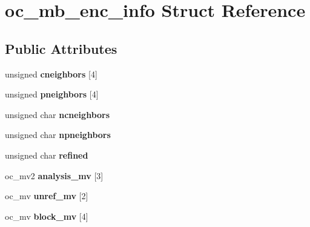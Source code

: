 \hypertarget{structoc__mb__enc__info}{\section{oc\+\_\+mb\+\_\+enc\+\_\+info Struct Reference}
\label{structoc__mb__enc__info}
}
\subsection*{Public Attributes}
\begin{DoxyCompactItemize}
\item 
\hypertarget{structoc__mb__enc__info_aad897a2c6b28665775770445798eb5e6}{unsigned {\bfseries cneighbors} \mbox{[}4\mbox{]}}\label{structoc__mb__enc__info_aad897a2c6b28665775770445798eb5e6}

\item 
\hypertarget{structoc__mb__enc__info_ae4c525d0e9ffafadc4cc9e86fe8dbc77}{unsigned {\bfseries pneighbors} \mbox{[}4\mbox{]}}\label{structoc__mb__enc__info_ae4c525d0e9ffafadc4cc9e86fe8dbc77}

\item 
\hypertarget{structoc__mb__enc__info_ace70691f2dbde546e1bac6bf825f3b90}{unsigned char {\bfseries ncneighbors}}\label{structoc__mb__enc__info_ace70691f2dbde546e1bac6bf825f3b90}

\item 
\hypertarget{structoc__mb__enc__info_aae5755e1914d9366ed0a449fd0202fe4}{unsigned char {\bfseries npneighbors}}\label{structoc__mb__enc__info_aae5755e1914d9366ed0a449fd0202fe4}

\item 
\hypertarget{structoc__mb__enc__info_a6740834c1785f70dc697afbef78f3ade}{unsigned char {\bfseries refined}}\label{structoc__mb__enc__info_a6740834c1785f70dc697afbef78f3ade}

\item 
\hypertarget{structoc__mb__enc__info_ad60ff5d0008e4e811b8e6ee250dc63a7}{oc\+\_\+mv2 {\bfseries analysis\+\_\+mv} \mbox{[}3\mbox{]}}\label{structoc__mb__enc__info_ad60ff5d0008e4e811b8e6ee250dc63a7}

\item 
\hypertarget{structoc__mb__enc__info_ad460fba366c420fe5ed62eb7e687ca4c}{oc\+\_\+mv {\bfseries unref\+\_\+mv} \mbox{[}2\mbox{]}}\label{structoc__mb__enc__info_ad460fba366c420fe5ed62eb7e687ca4c}

\item 
\hypertarget{structoc__mb__enc__info_aba34f02e6af9a3d98bfa540b6e1d1258}{oc\+\_\+mv {\bfseries block\+\_\+mv} \mbox{[}4\mbox{]}}\label{structoc__mb__enc__info_aba34f02e6af9a3d98bfa540b6e1d1258}


\end{DoxyCompactItemize}
